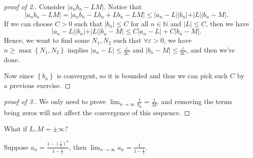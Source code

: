 \begin{proof}[proof of 2.]
	Consider \(\left\vert a_n b_n - LM \right\vert \). Notice that 
	\[
		\left\vert a_n b_n - LM \right\vert = \left\vert a_n b_n - L b_n + Lb_n - LM \right\vert \le \vert a_n - L \vert \vert b_n \vert + \vert L \vert \vert b_n - M \vert.      
	\] 
	If we can choose \(C>0\) such that \(\vert b_n \vert \le C \) for all \(n \in \mathbb{N} \) and \(\vert L \vert \le C \), then  we have 
	\[
		\vert a_n - L \vert \vert b_n \vert + \vert L \vert \vert b_n - M \vert \le C \vert a_n - L \vert + C \vert b_n - M \vert.      
	\]    Hence, we want to find some \(N_1, N_2\) such that \(\forall \varepsilon > 0\), we have \(n \ge \max \left\{ N_1, N_2 \right\} \) implies \(\vert a_n - L \vert \le \frac{\varepsilon}{2C} \) and \(\vert b_n - M \vert \le \frac{\varepsilon}{2C} \), and then we're done. 
	
	Now since \(\left\{ b_n \right\} \) is convergent, so it is bounded and thus we can pick such \(C\) by a previous exercise. 
\end{proof}
\begin{proof}[proof of 3.]
We only need to prove \(\lim_{n \to \infty} \frac{1}{b_n} = \frac{1}{M}\), and removing the terms being zeros will not affect the convergence of this sequence.
\end{proof}

\begin{note}
	What if \(L,M= \pm \infty\)? 
\end{note}

\begin{exercise}
	Suppose \(a_n = \frac{1 - \left( \frac{1}{2} \right)^n }{1 - \frac{1}{2}}\), then \(\lim_{n \to \infty} a_n = \frac{1}{1 - \frac{1}{2}} \).
\end{exercise}






